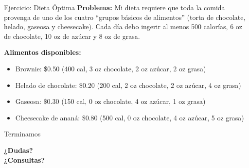 \documentclass{beamer}
\begin{document}
\begin{frame}{Ejercicio: Dieta Óptima}
    \textbf{Problema:}
    Mi dieta requiere que toda la comida provenga de uno de los cuatro ``grupos básicos de alimentos'' (torta de chocolate, helado, gaseosa y cheesecake). Cada día debo ingerir al menos 500 calorías, 6 oz de chocolate, 10 oz de azúcar y 8
    oz de grasa.

    \textbf{Alimentos disponibles:}
    \begin{itemize}
        \item Brownie: \$0.50 (400 cal, 3 oz chocolate, 2 oz azúcar, 2 oz grasa)
        \item Helado de chocolate: \$0.20 (200 cal, 2 oz chocolate, 2 oz azúcar, 4 oz grasa)
        \item Gaseosa: \$0.30 (150 cal, 0 oz chocolate, 4 oz azúcar, 1 oz grasa)
        \item Cheesecake de ananá: \$0.80 (500 cal, 0 oz chocolate, 4 oz azúcar, 5 oz grasa)
    \end{itemize}
\end{frame}

\begin{frame}{Terminamos}
    \begin{center}
        \Large{\textbf{¿Dudas?\\¿Consultas?}}
    \end{center}
\end{frame}
\end{document}
